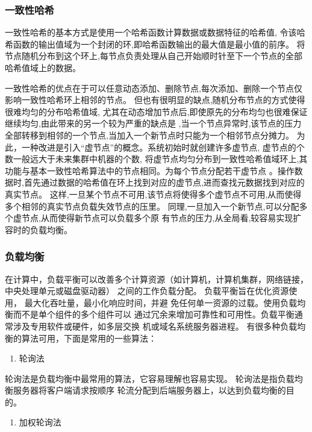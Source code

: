 \subsubsection{一致性哈希}
一致性哈希的基本方式是使用一个哈希函数计算数据或数据特征的哈希值,
令该哈希函数的输出值域为一个封闭的环,即哈希函数输出的最大值是最小值的前序。
将节点随机分布到这个环上,每节点负责处理从自己开始顺时针至下一个节点的全部哈希值域上的数据。 

一致性哈希的优点在于可以任意动态添加、删除节点,每次添加、删除一个节点仅影响一致性哈希环上相邻的节点。 
但也有很明显的缺点,随机分布节点的方式使得很难均匀的分布哈希值域,
尤其在动态增加节点后,即使原先的分布均匀也很难保证继续均匀,由此带来的另一个较为严重的缺点是
,当一个节点异常时,该节点的压力全部转移到相邻的一个节点,当加入一个新节点时只能为一个相邻节点分摊力。 
为此，一种改进是引入“虚节点”的概念。系统初始时就创建许多虚节点, 虚节点的个数一般远大于未来集群中机器的个数,
将虚节点均匀分布到一致性哈希值域环上,其功能与基本一致性哈希算法中的节点相同。为每个节点分配若干虚节点
。操作数据时,首先通过数据的哈希值在环上找到对应的虚节点,进而查找元数据找到对应的真实节点。
这样,一旦某个节点不可用,该节点将使得多个虚节点不可用,从而使得多个相邻的真实节点负载失效节点的压里。
同理,一旦加入一个新节点,可以分配多个虚节点,从而使得新节点可以负载多个原
有节点的压力,从全局看,较容易实现扩容时的负载均衡。 
\subsubsection{负载均衡}
在计算中，负载平衡可以改善多个计算资源（如计算机，计算机集群，网络链接，中央处理单元或磁盘驱动器）
之间的工作负载分配。
负载平衡旨在优化资源使用，
最大化吞吐量，最小化响应时间，并避
免任何单一资源的过载。使用负载均衡而不是单个组件的多个组件可以
通过冗余来增加可靠性和可用性。负载平衡通常涉及专用软件或硬件，如多层交换
机或域名系统服务器进程。
有很多种负载均衡的算法可用，下面是常用的一些算法：



	\begin{enumerate}
		\item 轮询法
	\end{enumerate}

	轮询法是负载均衡中最常用的算法，它容易理解也容易实现。 
	轮询法是指负载均衡服务器将客户端请求按顺序
	轮流分配到后端服务器上，以达到负载均衡的目的。 	

\begin{enumerate}[resume]
	\item 加权轮询法
\end{enumerate}


